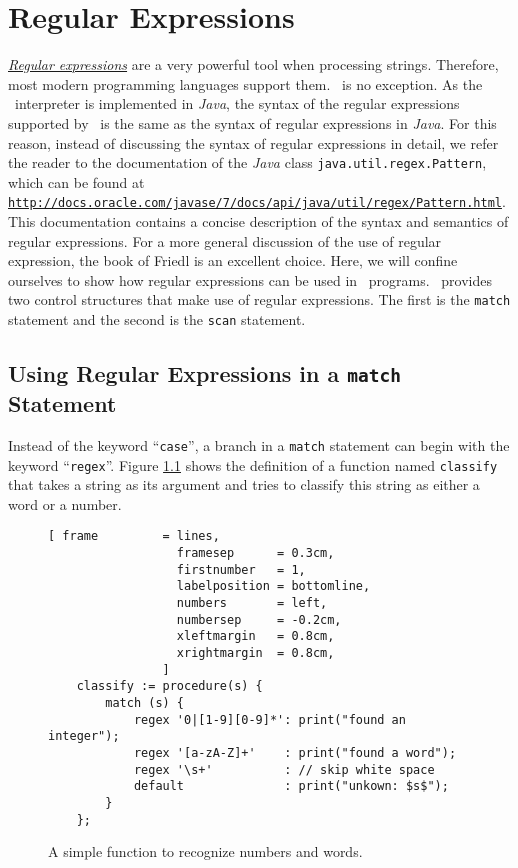 \chapter{Regular Expressions \label{chapter:regular-expressions}}
\href{http://en.wikipedia.org/wiki/Regular_expression}{\emph{Regular expressions}}
are a very powerful tool when processing strings.
Therefore, most modern programming languages support them.  \setlx\ is no exception.  
As the \setlx\ interpreter is implemented in \textsl{Java}, the syntax of the regular expressions
supported by \setlx\ is the same as the syntax of regular expressions in \textsl{Java}.  For this
reason, instead of discussing the syntax of regular expressions in detail, we refer the reader to
the documentation of the \textsl{Java} class \texttt{java.util.regex.Pattern}, which can
be found at
\\[0.2cm]
\hspace*{1.3cm}
\href{http://docs.oracle.com/javase/7/docs/api/java/util/regex/Pattern.html}{\texttt{http://docs.oracle.com/javase/7/docs/api/java/util/regex/Pattern.html}}.
\\[0.2cm]
This documentation contains a concise description of the syntax and semantics of regular expressions.
For a more general discussion of the use of regular expression, the book of Friedl
\cite{friedl:2006} is an excellent choice.
Here, we will confine ourselves to show how regular expressions can be used in
\setlx\ programs.  \setlx\ provides two control structures that make use of regular expressions.
The first is the \texttt{match} statement and the second is the \texttt{scan} statement.

\section{Using Regular Expressions in a \texttt{match} Statement}
Instead of the keyword ``\texttt{case}'', a branch in a \texttt{match} statement can begin
with the keyword ``\texttt{regex}''.  Figure \ref{fig:regexp.stlx} shows the definition of
a function named \texttt{classify} that takes a string as its argument
and tries to classify this string as either a word or a number.  


\begin{figure}[!ht]
\centering
\begin{Verbatim}[ frame         = lines, 
                  framesep      = 0.3cm, 
                  firstnumber   = 1,
                  labelposition = bottomline,
                  numbers       = left,
                  numbersep     = -0.2cm,
                  xleftmargin   = 0.8cm,
                  xrightmargin  = 0.8cm,
                ]
    classify := procedure(s) {
        match (s) {
            regex '0|[1-9][0-9]*': print("found an integer");
            regex '[a-zA-Z]+'    : print("found a word");
            regex '\s+'          : // skip white space
            default              : print("unkown: $s$");
        }
    };
\end{Verbatim}
\vspace*{-0.3cm}
\caption{A simple function to recognize numbers and words.}
\label{fig:regexp.stlx}
\end{figure}

